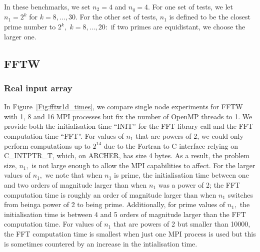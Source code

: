 \documentclass[a4]{article}
\begin{document}
In these benchmarks, we set $n_2=4$ and $n_q=4.$ For one set of tests, we let
 $n_1=2^k$ for $k=8,\ldots,30.$ For the other set of tests, $n_1$ is defined 
to be the closest prime number to $2^k,$ $k=8,\ldots,20:$ if two primes are 
equidistant, we choose the larger one.





\subsection{FFTW}

\subsubsection{Real input array}\label{Sec:FFTWReal}

 In Figure~\ref{Fig:fftw1d_times}, we compare single node experiments for FFTW with 1, 8 and 16 
MPI processes but fix the number of OpenMP threads to 1. We provide both the 
initialisation time ``INIT'' for the FFT library call and the FFT computation 
time ``FFT''. For values of $n_1$ that are powers of 2, we could only perform 
computations up to $2^14$ due to the Fortran to C interface relying on 
C\_INTPTR\_T, which, on ARCHER, has size 4 bytes. As a result, the problem size, 
$n_1,$ is not large enough to allow the MPI capabilities to affect. For the 
larger values of $n_1,$ we note that when $n_1$ is prime, the 
initialisation time between one and two orders of magnitude larger than when $n_1$ was a power of 2; the FFT computation time is roughly an order of magnitude 
larger than when $n_1$ switches from beinga power of 2 to being prime. Additionally, for prime values of $n_1,$ the initialisation time is between 4 and 5 orders of magnitude larger than the FFT computation time. For values of $n_1$ that are powers of 2 but smaller than 10000, the FFT computation time is smallest when just one  MPI process is used but this is sometimes countered by an increase in the intialisation time.
\end{document}

